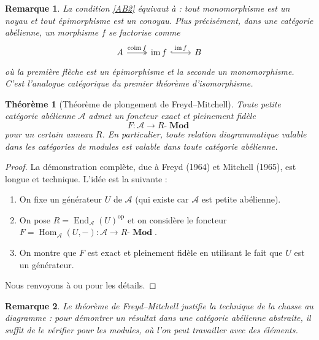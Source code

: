\documentclass[a4paper,12pt]{book}
\DeclareMathOperator{\Hom}{Hom}
\DeclareMathOperator{\End}{End}
\DeclareMathOperator{\im}{im}
\DeclareMathOperator{\Mod}{\mathbf{Mod}}
\newcommand{\op}{\mathrm{op}}
\newtheorem{theoreme}{Théorème}[chapter]
\newtheorem*{remarque}{Remarque}
\begin{document}
\begin{remarque}\label{rem:abelian-reformulation}
La condition \ref{AB2} équivaut à : tout monomorphisme est un noyau et tout
épimorphisme est un conoyau. Plus précisément, dans une catégorie
abélienne, un morphisme $f$ se factorise comme
\[
\begin{tikzcd}
A \arrow[r, two heads, "\operatorname{coim} f"]
& \im f \arrow[r, hook, "\im f"]
& B
\end{tikzcd}
\]
où la première flèche est un épimorphisme et la seconde un monomorphisme.
C'est l'analogue catégorique du premier théorème d'isomorphisme.
\end{remarque}

\begin{theoreme}[Théorème de plongement de Freyd--Mitchell]%
\label{thm:freyd-mitchell}
Toute petite catégorie abélienne $\mathcal{A}$ admet un foncteur
exact et pleinement fidèle
\[
  F \colon \mathcal{A} \longrightarrow R\text{-}\Mod
\]
pour un certain anneau $R$. En particulier, toute relation
diagrammatique valable dans les catégories
de modules est valable dans toute catégorie abélienne.
\end{theoreme}

\begin{proof}
La démonstration complète, due à Freyd (1964) et Mitchell (1965),
est longue et technique. L'idée est la suivante :
\begin{enumerate}[label=\arabic*.]
\item On fixe un générateur $U$ de $\mathcal{A}$
  (qui existe car $\mathcal{A}$ est petite abélienne).
\item On pose $R = \End_{\mathcal{A}}(U)^{\op}$ et on considère le
  foncteur $F = \Hom_{\mathcal{A}}(U, -) \colon \mathcal{A} \to R\text{-}\Mod$.
\item On montre que $F$ est exact et pleinement fidèle en utilisant
  le fait que $U$ est un générateur.
\end{enumerate}
Nous renvoyons à \cite{freyd1964} ou \cite{mitchell1965} pour les
détails.
\end{proof}

\begin{remarque}\label{rem:freyd-mitchell-usage}
Le théorème de Freyd--Mitchell
justifie la technique de la \emph{chasse au diagramme} :
pour démontrer un résultat dans une catégorie abélienne abstraite,
il suffit de le vérifier pour les modules, où l'on peut travailler
avec des éléments.
\end{remarque}
\end{document}
